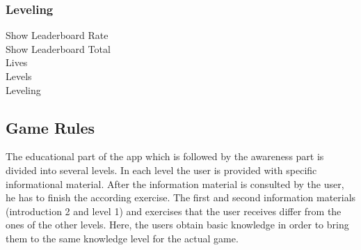 \subsubsection{Leveling}

\begin{description}
	\item[Show Leaderboard Rate]
	\item[Show Leaderboard Total]
	\item[Lives]
	\item[Levels]
	\item[Leveling]
\end{description}


\subsection{Game Rules}
The educational part of the app which is followed by the awareness part is divided into several levels.
 In each level the user is provided with specific informational material.
 After the information material is consulted by the user, he has to finish the according exercise.
The first  and second information materials (introduction 2 and level 1) and exercises that the user receives differ from the ones of the other levels. Here, the users obtain basic knowledge in order to bring them to the same knowledge level for the actual game.
 
